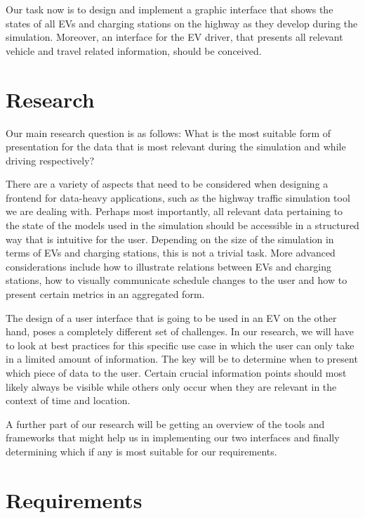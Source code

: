 \documentclass[hidelinks]{sig-alternate}
\begin{document}
Our task now is to design and implement a graphic interface that shows the states of all EVs and charging stations on
the highway as they develop during the simulation. Moreover, an interface for the EV driver, that presents all
relevant vehicle and travel related information, should be conceived.


\section{Research}

Our main research question is as follows: What is the most suitable form of presentation for the data that is most
relevant during the simulation and while driving respectively?

There are a variety of aspects that need to be considered when designing a frontend for data-heavy applications,
such as the highway traffic simulation tool we are dealing with. Perhaps most importantly, all relevant data
pertaining to the state of the models used in the simulation should be accessible in a structured way that is intuitive
for the user. Depending on the size of the simulation in terms of EVs and charging stations, this is not a trivial
task. More advanced considerations include how to illustrate relations between EVs and charging stations, how to
visually communicate schedule changes to the user and how to present certain metrics in an aggregated form.

The design of a user interface that is going to be used in an EV on the other hand, poses a completely different set
of challenges. In our research, we will have to look at best practices for this specific use case in which the user
can only take in a limited amount of information. The key will be to determine when to present which piece of
data to the user. Certain crucial information points should most likely always be visible while others only occur
when they are relevant in the context of time and location.

A further part of our research will be getting an overview of the tools and frameworks that might help us in
implementing our two interfaces and finally determining which if any is most suitable for our requirements.


\section{Requirements}
\end{document}
